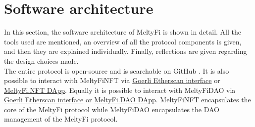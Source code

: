 \section{Software architecture}\label{sec:softwareArchitecture}
In this section, the software architecture of MeltyFi is shown in detail. All the tools used are mentioned, an overview of all the protocol components is given, and then they are explained individually. Finally, reflections are given regarding the design choices made. 
\\
\indent The entire protocol is open-source and is searchable on GitHub \cite{MeltyFi}. It is also possible to interact with MeltyFiNFT via \href{https://goerli.etherscan.io/address/0x6c1030B8BbE523671Bcfd774Ae59ef620f9f31b4}{Goerli Etherscan interface} or \href{https://meltyfi.nft}{MeltyFi.NFT DApp}. Equally it is possible to interact with MeltyFiDAO via \href{https://goerli.etherscan.io/address/0xC4AA65a48fd317070F1A5aC5eBAC70F9d022Fb1e}{Goerli Etherscan interface} or \href{https://meltyfi.dao}{MeltyFi.DAO DApp}. MeltyFiNFT encapsulates the core of the MeltyFi protocol while MeltyFiDAO encapsulates the DAO management of the MeltyFi protocol.

